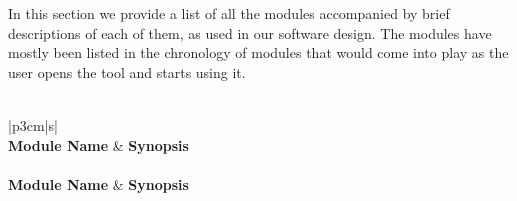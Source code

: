 \documentclass{report}
\begin{document}
In this section we provide a list of all the modules accompanied by brief descriptions of each of them, as used in our software design. The modules have mostly been listed in the chronology of modules that would come into play as the user opens the tool and starts using it. \\\\
\newpage
\begin{longtable}{ |p{3cm}|s| }
\hline
{}  \\
\hline
{}\textbf{Module Name} & \textbf{Synopsis} \\
\hline
\hline
\endfirsthead
\hline
{}  \\
\hline
{}\textbf{Module Name} & \textbf{Synopsis} \\
\hline
\hline
\endhead


\end{longtable}
\end{document}
